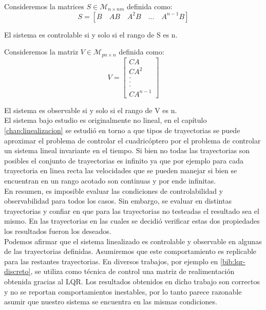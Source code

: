 \documentclass[main]{subfiles}
\begin{document}
Consideremos la matrices $S\in \mathcal{M}_{n \times nm}$  definida como:
\begin{equation}
\label{eq:contr}
S = [B \quad AB \quad A^2B \quad ...\quad A^{n-1}B]
\end{equation}

El sistema es controlable si y solo si el rango de S es n. 

Consideremos la matriz $V\in \mathcal{M}_{pn \times n}$ definida como:
\begin{equation}
\label{eq:obs}
V=
\left[
\begin{array}{c}
 CA\\
CA^2\\
.\\
.\\
.\\
CA^{n-1}
\end{array}\right]
\end{equation}

El sistema es observable si y solo si el rango de V es n.\\

El sistema bajo estudio es originalmente no lineal, en el cap\'itulo \ref{chap:linealizacion} se estudi\'o en torno a que tipos de trayectorias se puede aproximar el problema de controlar el cuadric\'optero por el problema de controlar un sistema lineal invariante en el tiempo. Si bien no todas las trayectorias son posibles el conjunto de trayectorias es infinito ya que por ejemplo para cada trayectoria en linea recta las velocidades que se pueden manejar si bien se encuentran en un rango acotado son continuas y por ende infinitas.\\

En resumen, es imposible evaluar las condiciones de controlabilidad y observabilidad para todos los casos. Sin embargo, se evaluar en distintas trayectorias y confiar en que para las trayectorias no testeadas el resultado sea el mismo. En las trayectorias en las cuales se decidi\'o verificar estas dos propiedades los resultados fueron los deseados.\\

Podemos afirmar que el sistema linealizado es controlable y observable en algunas de las trayectorias definidas. Asumiremos que este comportamiento es replicable para las restantes trayectorias. En diversos trabajos, por ejemplo en \ref{bib:lqr-discreto}, se utiliza como t\'ecnica de control una matriz de realimentaci\'on obtenida gracias al LQR. Los resultados obtenidos en dicho trabajo son correctos y no se reportan comportamientos inestables, por lo tanto parece razonable asumir que nuestro sistema se encuentra en las mismas condiciones.   
\end{document}
